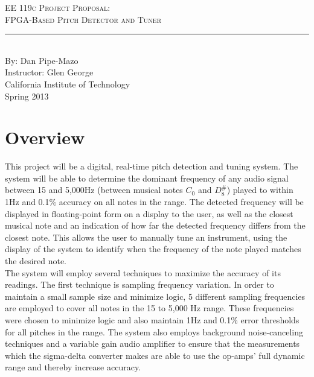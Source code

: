 \documentclass[aps,letterpaper,10pt]{revtex4}
\newcommand{\labname}{EE 119c Project Proposal}
\newcommand{\descript}{FPGA-Based Pitch Detector and Tuner}
\newcommand{\authorname}{Dan Pipe-Mazo}
\newcommand{\professor}{Glen George}
\newcommand{\classno}{Spring 2013}
\begin{document}


\begin{titlepage}
\begin{center}
{\LARGE \textsc{\labname:} \\ \vspace{4pt}}
{\Large \textsc{\descript} \\ \vspace{4pt}} 
\rule[13pt]{\textwidth}{1pt} \\ \vspace{150pt}
{\large By: \authorname \\ \vspace{10pt}
Instructor: \professor \\ \vspace{10pt}
California Institute of Technology \\ \vspace{10pt}
\classno \\ \vspace{10pt}}
\end{center}
\end{titlepage}

\section{Overview}

This project will be a digital, real-time pitch detection and tuning system. The system will be able to determine the dominant frequency of any audio signal between 15 and 5,000Hz (between musical notes $C_0$ and $D^\#_8$) played to within 1Hz and 0.1\% accuracy on all notes in the range. The detected frequency will be displayed in floating-point form on a display to the user, as well as the closest musical note and an indication of how far the detected frequency differs from the closest note. This allows the user to manually tune an instrument, using the display of the system to identify when the frequency of the note played matches the desired note. \\ 

The system will employ several techniques to maximize the accuracy of its readings. The first technique is sampling frequency variation. In order to maintain a small sample size and minimize logic, 5 different sampling frequencies are employed to cover all notes in the 15 to 5,000 Hz range. These frequencies were chosen to minimize logic and also maintain 1Hz and 0.1\% error thresholds for all pitches in the range. The system also employs background noise-canceling techniques and a variable gain audio amplifier to ensure that the measurements which the sigma-delta converter makes are able to use the op-amps' full dynamic range and thereby increase accuracy. \\
\end{document}
